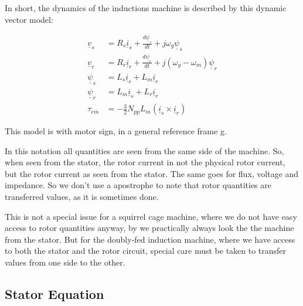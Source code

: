 \documentclass[]{book}
\begin{document}
In short, the dynamics of the inductions machine is described by this dynamic vector model:

\[
\begin{aligned}
\underline{v}_s & = R_s \underline{i}_s + \frac{d\underline{\psi}_s}{dt} + j \omega_g \underline{\psi}_s  \\
\underline{v}_r & = R_r \underline{i}_r + \frac{d\underline{\psi}_r}{dt} + j (\omega_g-\omega_m) \underline{\psi}_r \\
\underline{\psi}_s & = L_s \underline{i}_s + L_m \underline{i}_r\\
\underline{\psi}_r & = L_m \underline{i}_s + L_r \underline{i}_r\\
\tau_{em} &= - \frac{3}{2}N_{pp}L_m(\underline{i}_s  \times \underline{i}_r)
\end{aligned}
\label{eq:genDqMdl}
\]

This model is with motor sign, in a general reference frame g.

In this notation all quantities are seen from the same side of the machine. So, when seen from the stator, the rotor current in not the physical rotor current, but the rotor current as seen from the stator. The same goes for flux, voltage and impedance. So we don't use a apostrophe to note that rotor quantities are transferred values, as it is sometimes done.

This is not a special issue for a squirrel cage machine, where we do not have easy access to rotor quantities anyway, by we practically always look the the machine from the stator. But for the doubly-fed induction machine, where we have access to both the stator and the rotor circuit, special care must be taken to transfer values from one side to the other.

\hypertarget{stator-equation}{%
\subsection{Stator Equation}\label{stator-equation}}
\end{document}
